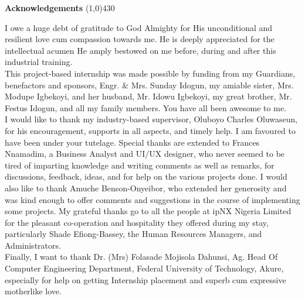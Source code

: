 \begin{center}
{\huge \bf Acknowledgements}
\line(1,0){430}
\end{center}



I owe a huge debt of gratitude to God Almighty for His unconditional and resilient love cum compassion towards me. He is deeply appreciated for the intellectual acumen He amply bestowed on me before, during and after this industrial training.\\

This project-based internship was made possible by funding from my Guardians, benefactors and sponsors, Engr. \& Mrs. Sunday Idogun, my amiable sister, Mrs. Modupe Igbekoyi, and her husband, Mr. Idowu Igbekoyi, my great brother, Mr. Festus Idogun, and all my family members. You have all been awesome to me.\\

I would like to thank my industry-based supervisor, Oluboyo Charles Oluwaseun, for his encouragement, supports in all aspects, and timely help. I am favoured to have been under your tutelage. Special thanks are extended to Frances Nnamadim, a Business Analyst and UI/UX designer, who never seemed to be tired of imparting knowledge and writing comments as well as remarks, for discussions, feedback, ideas, and for help on the various projects done. I would also like to thank Amuche Benson-Onyeibor, who extended her generosity and was kind enough to offer
comments and suggestions in the course of implementing some projects. My grateful thanks go to all the people at ipNX Nigeria Limited for the pleasant co-operation and hospitality they offered during my stay, particularly Shade Efiong-Bassey, the Human Resources Managers, and Administrators.\\

Finally, I want to thank Dr. (Mrs) Folasade Mojisola Dahunsi,  Ag. Head Of Computer Engineering Department, Federal University of Technology, Akure, especially for help on getting Internship placement and superb cum expressive motherlike love.

